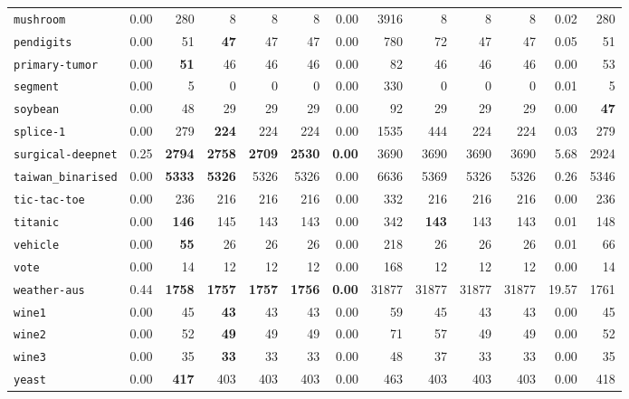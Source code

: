 \begin{tabular}{lrrrrrrrrrrrr}
\texttt{mushroom} & 0.00 & 280 & 8 & 8 & 8 & 0.00 & 3916 & 8 & 8 & 8 & 0.02 & 280\\
\texttt{pendigits} & 0.00 & 51 & \textbf{47} & 47 & 47 & 0.00 & 780 & 72 & 47 & 47 & 0.05 & 51\\
\texttt{primary-tumor} & 0.00 & \textbf{51} & 46 & 46 & 46 & 0.00 & 82 & 46 & 46 & 46 & 0.00 & 53\\
\texttt{segment} & 0.00 & 5 & 0 & 0 & 0 & 0.00 & 330 & 0 & 0 & 0 & 0.01 & 5\\
\texttt{soybean} & 0.00 & 48 & 29 & 29 & 29 & 0.00 & 92 & 29 & 29 & 29 & 0.00 & \textbf{47}\\
\texttt{splice-1} & 0.00 & 279 & \textbf{224} & 224 & 224 & 0.00 & 1535 & 444 & 224 & 224 & 0.03 & 279\\
\texttt{surgical-deepnet} & 0.25 & \textbf{2794} & \textbf{2758} & \textbf{2709} & \textbf{2530} & \textbf{0.00} & 3690 & 3690 & 3690 & 3690 & 5.68 & 2924\\
\texttt{taiwan\_binarised} & 0.00 & \textbf{5333} & \textbf{5326} & 5326 & 5326 & 0.00 & 6636 & 5369 & 5326 & 5326 & 0.26 & 5346\\
\texttt{tic-tac-toe} & 0.00 & 236 & 216 & 216 & 216 & 0.00 & 332 & 216 & 216 & 216 & 0.00 & 236\\
\texttt{titanic} & 0.00 & \textbf{146} & 145 & 143 & 143 & 0.00 & 342 & \textbf{143} & 143 & 143 & 0.01 & 148\\
\texttt{vehicle} & 0.00 & \textbf{55} & 26 & 26 & 26 & 0.00 & 218 & 26 & 26 & 26 & 0.01 & 66\\
\texttt{vote} & 0.00 & 14 & 12 & 12 & 12 & 0.00 & 168 & 12 & 12 & 12 & 0.00 & 14\\
\texttt{weather-aus} & 0.44 & \textbf{1758} & \textbf{1757} & \textbf{1757} & \textbf{1756} & \textbf{0.00} & 31877 & 31877 & 31877 & 31877 & 19.57 & 1761\\
\texttt{wine1} & 0.00 & 45 & \textbf{43} & 43 & 43 & 0.00 & 59 & 45 & 43 & 43 & 0.00 & 45\\
\texttt{wine2} & 0.00 & 52 & \textbf{49} & 49 & 49 & 0.00 & 71 & 57 & 49 & 49 & 0.00 & 52\\
\texttt{wine3} & 0.00 & 35 & \textbf{33} & 33 & 33 & 0.00 & 48 & 37 & 33 & 33 & 0.00 & 35\\
\texttt{yeast} & 0.00 & \textbf{417} & 403 & 403 & 403 & 0.00 & 463 & 403 & 403 & 403 & 0.00 & 418\\
\bottomrule
\end{tabular}
